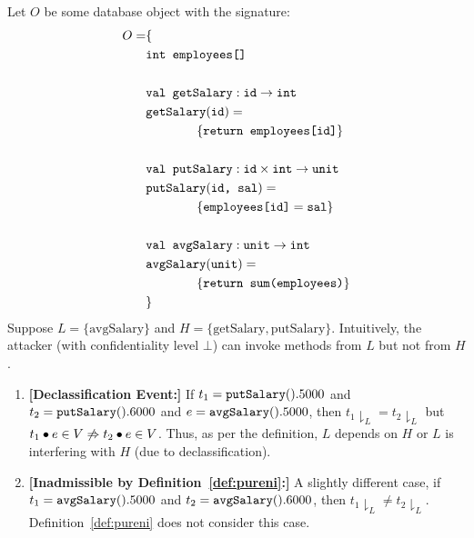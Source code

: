 \documentclass[acmsmall,screen,review, nonacm]{acmart}
\begin{document}
\begin{example} \label{ex1}
  Let $O$ be some database object with the signature:
  \begin{align*}
    O = & \{ \\
    & \texttt{int} \texttt{ employees[]} \\
    \\
    & \texttt{val } \texttt{getSalary}: \texttt{id} \to \texttt{int} \\
    & \texttt{getSalary} (\texttt{id}) =  \\
    & \qquad \qquad \{ \texttt{return employees[id]} \} \\
    \\
    & \texttt{val } \texttt{putSalary}: \texttt{id} \times \texttt{int} \to \texttt{unit} \\
    & \texttt{putSalary} ( \texttt{id, sal}) =  \\
    & \qquad \qquad   \{ \texttt{employees[id]} = \texttt{sal}  \} \\
    \\
    & \texttt{val } \texttt{avgSalary}: \texttt{unit} \to \texttt{int} \\
    & \texttt{avgSalary} (\texttt{unit}) =  \\
    & \qquad \qquad \{ \texttt{return sum(employees)} \} \\
    & \}
  \end{align*}
  Suppose $L = \{ \text{avgSalary} \}$ and $H = \{\text{getSalary}, \text{putSalary} \}$. Intuitively, the  attacker (with confidentiality level $\bot$) can  invoke  methods from $L$ but not from $H$.
  \end{example}

\begin{enumerate}


\item \textbf{[Declassification Event:]}
If $t_1 = \texttt{putSalary}().5000$ and  $t_2 = \texttt{putSalary}().6000$ and $e = \texttt{avgSalary}().5000$, then $t_1\downharpoonright_L = t_2\downharpoonright_L$ but  $t_1 \bullet e \in V \not \Rightarrow t_2 \bullet e \in V$. Thus, as per the definition, $L$ depends on $H$ or $L$ is interfering with $H$ (due to declassification).

\item \textbf{[Inadmissible by Definition~\ref{def:pureni}:]}
A slightly different case,  if $t_1 = \texttt{avgSalary}().5000$ and  $t_2 = \texttt{avgSalary}().6000$, then $t_1\downharpoonright_L \ne t_2\downharpoonright_L$. Definition~\ref{def:pureni} does not consider this case.

\end{enumerate}
\end{document}
